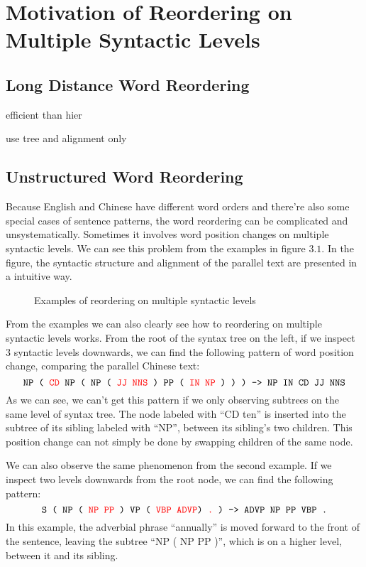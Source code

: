 \section{Motivation of Reordering on Multiple Syntactic Levels}
\label{ch:ReorderingApproach:sec:Motivation}



\subsection{Long Distance Word Reordering}

efficient than hier

use tree and alignment only

\subsection{Unstructured Word Reordering}

Because English and Chinese have different word orders and there're also some special cases of sentence patterns, the word reordering can be complicated and unsystematically. Sometimes it involves word position changes on multiple syntactic levels. We can see this problem from the examples in figure $3.1$. In the figure, the syntactic structure and alignment of the parallel text are presented in a intuitive way.

\begin{figure}[H]
\centering
\subfigure {

}
\subfigure {

}
\caption{Examples of reordering on multiple syntactic levels}
\end{figure}

From the examples we can also clearly see how to reordering on multiple syntactic levels works. From the root of the syntax tree on the left, if we inspect 3 syntactic levels downwards, we can find the following pattern of word position change, comparing the parallel Chinese text:
$$\texttt{NP ( {\color{red}CD} NP ( NP ( {\color{red}JJ NNS} ) PP ( {\color{red}IN NP} ) ) ) -> NP IN CD JJ NNS}$$
As we can see, we can't get this pattern if we only observing subtrees on the same level of syntax tree. The node labeled with ``CD ten'' is inserted into the subtree of its sibling labeled with ``NP'', between its sibling's two children. This position change can not simply be done by swapping children of the same node.

We can also observe the same phenomenon from the second example. If we inspect two levels downwards from the root node, we can find the following pattern:
$$\texttt{S ( NP ( {\color{red}NP PP} ) VP ( {\color{red}VBP ADVP}) {\color{red}.} ) -> ADVP NP PP VBP .}$$
In this example, the adverbial phrase ``annually'' is moved forward to the front of the sentence, leaving the subtree ``NP ( NP PP )'', which is on a higher level, between it and its sibling.

